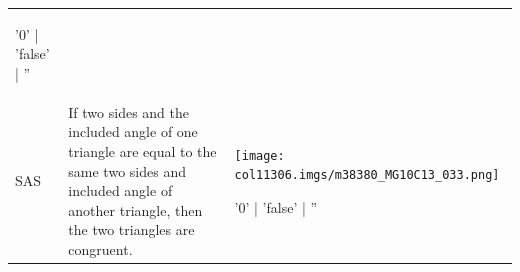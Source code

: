 \begin{table}[H]
\begin{center}
\begin{xtabular*}{\mytablewidth}[t]{|p{10\mystarwidth}|p{10\mystarwidth}|p{
10\mystarwidth}|}
\begin{center}
      \vspace{2pt}
    \vspace{.1in}
    
    \end{center}



    \addtocounter{footnote}{-0}
    
'0' | 'false' | ''
     \tabularnewline{}
    
    
        SAS &
    
    
        If two sides and the included angle of one triangle are equal to the
same two sides and included angle of another triangle, then the two triangles
are congruent. &
    
    
        
                    
    \setcounter{subfigure}{0}

\label{m38380*id318143}
    \begin{center}
   
\label{m38380*id318143!!!underscore!!!media}\label{
m38380*id318143!!!underscore!!!printimage}\texttt{[image: 
col11306.imgs/m38380\_MG10C13\_033.png]} %
        
      \vspace{2pt}
    \vspace{.1in}
    
    \end{center}



    \addtocounter{footnote}{-0}
    
'0' | 'false' | ''
     \tabularnewline{}
    

\end{xtabular*}
\end{center}
\end{table}
